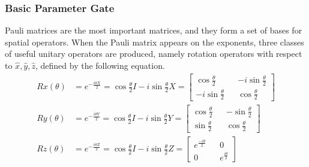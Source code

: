 \subsubsection{Basic Parameter Gate}
Pauli matrices are the most important matrices, and they form a set of bases for spatial operators. When the Pauli matrix appears on the exponents, three classes of useful unitary operators are produced, namely rotation operators with respect to $\hat{x}, \hat{y}, \hat{z}$, defined by the following equation.\\
\begin{align*}
    Rx(\theta) & =e^{-\frac{i\theta X}{2}}=\cos{\frac{\theta}{2}}I-i\sin{\frac{\theta}{2}}X=\begin{bmatrix}
        \cos{\frac{\theta}{2}}   &  & -i\sin{\frac{\theta}{2}} \\
        -i\sin{\frac{\theta}{2}} &  & \cos{\frac{\theta}{2}}
    \end{bmatrix} %
    \\
    Ry(\theta) & =e^{-\frac{i\theta Y}{2}}=\cos{\frac{\theta}{2}}I-i\sin{\frac{\theta}{2}}Y=\begin{bmatrix}
        \cos{\frac{\theta}{2}} &  & -\sin{\frac{\theta}{2}} \\
        \sin{\frac{\theta}{2}} &  & \cos{\frac{\theta}{2}}
    \end{bmatrix} %
    \\
    Rz(\theta) & =e^{-\frac{i\theta Z}{2}}=\cos{\frac{\theta}{2}}I-i\sin{\frac{\theta}{2}}Z=\begin{bmatrix}
        e^{\frac{-i\theta}{2}} &  & 0                     \\
        0                      &  & e^{\frac{i\theta}{2}}
    \end{bmatrix} %
\end{align*}


